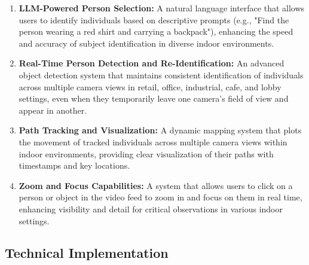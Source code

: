 \begin{enumerate}[leftmargin=80pt]
    \item \textbf{LLM-Powered Person Selection:} A natural language interface that allows users to identify individuals
    based on descriptive prompts (e.g., "Find the person wearing a red shirt and carrying a backpack"), enhancing the speed
    and accuracy of subject identification in diverse indoor environments.
    \item \textbf{Real-Time Person Detection and Re-Identification:} An advanced object detection system that maintains
    consistent identification of individuals across multiple camera views in retail, office, industrial, cafe, and lobby settings,
    even when they temporarily leave one camera's field of view and appear in another.
    \item \textbf{Path Tracking and Visualization:} A dynamic mapping system that plots the movement of tracked individuals
    across multiple camera views within indoor environments, providing clear visualization of their paths with timestamps and key locations.
    \item \textbf{Zoom and Focus Capabilities:} A system that allows users to click on a person or object in the video feed
    to zoom in and focus on them in real time, enhancing visibility and detail for critical observations in various indoor settings.
\end{enumerate}

\subsection{Technical Implementation}
\label{subsection:technical-implementation}

